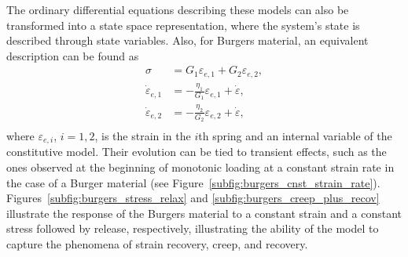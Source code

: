 The ordinary differential equations describing these models can also be transformed into a state space representation, where the system's state is described through state variables.
Also, for Burgers material, an equivalent description can be found as
\begin{align}
\label{eq:state_var_desc_burgers}
	\sigma &= G_1\varepsilon_{e,1} + G_2\varepsilon_{e,2},\\
	\dot \varepsilon_{e,1} &= -\frac{\eta_1}{G_1}\varepsilon_{e,1} + \dot \varepsilon,\\
	\dot \varepsilon_{e,2} &= -\frac{\eta_2}{G_2}\varepsilon_{e,2} + \dot \varepsilon,\\
\end{align}
where $\varepsilon_{e, i}$, $i=1,2$, is the strain in the $i$th spring and an internal variable of the constitutive model.
Their evolution can be tied to transient effects, such as the ones observed at the beginning of monotonic loading at a constant strain rate in the case of a Burger material (see Figure~\ref{subfig:burgers_cnst_strain_rate}).
Figures~\ref{subfig:burgers_stress_relax} and \ref{subfig:burgers_creep_plus_recov} illustrate the response of the Burgers material to a constant strain and a constant stress followed by release, respectively, illustrating the ability of the model to capture the phenomena of strain recovery, creep, and recovery.
